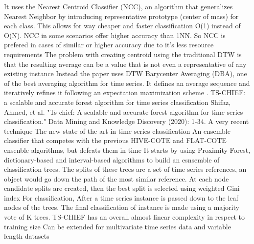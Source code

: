 \newline It uses the Nearest Centroid Classifier (NCC), an algorithm that generalizes Nearest Neighbor by introducing representative prototype (center of mass) for each class. This allows for way cheaper and faster classification O(1) instead of O(N).
\newline NCC in some scenarios offer higher accuracy than 1NN. So NCC is prefered in cases of similar or higher accuracy due to it's less resource requirements
\newline The problem with creating centroid using the traditional DTW is that the resulting average can be a value that is not even a representative of any existing instance
\newline Instead the paper uses DTW Barycenter Averaging (DBA), one of the best averaging algorithm for time series. It defines an average sequence and iteratively refines it following an expectation maximization scheme
. TS-CHIEF: a scalable and accurate forest algorithm for time series classification
\newline Shifaz, Ahmed, et al. "Ts-chief: A scalable and accurate forest algorithm for time series classification." Data Mining and Knowledge Discovery (2020): 1-34.
\newline A very recent technique
\newline The new state of the art in time series classification
\newline An ensemble classifier that competes with the previous HIVE-COTE and FLAT-COTE ensenble algorithms, but defeats them in time
\newline It starts by using Proximity Forest, dictionary-based and interval-based algorithms to build an esnsemble of classification trees. The splits of these trees are a set of time series references, an object would go down the path of the most similar reference.
\newline At each node candidate splits are created, then the best split is selected using weighted Gini index
\newline For classification, After a time series instance is passed down to the leaf nodes of the trees. The final classification of instance is made using a majority vote of K trees.
\newline TS-CHIEF has an overall almost linear complexity in respect to training size
\newline Can be extended for multivariate time series data and variable length datasets